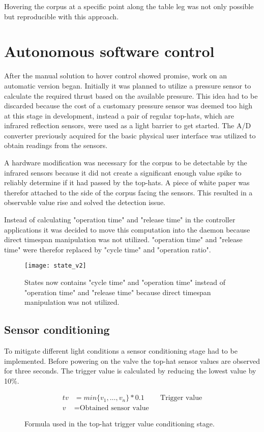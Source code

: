 Hovering the corpus at a specific point along the table leg was not only possible but reproducible with this approach.  

\section{Autonomous software control}
\author{Philip Trauner}

After the manual solution to hover control showed promise, work on an automatic version began. Initially it was planned to utilize a pressure sensor to calculate the required thrust based on the available pressure. This idea had to be discarded because the cost of a customary pressure sensor was deemed too high at this stage in development, instead a pair of regular top-hats, which are infrared reflection sensors, were used as a light barrier to get started. The A/D converter previously acquired for the basic physical user interface was utilized to obtain readings from the sensors.

A hardware modification was necessary for the corpus to be detectable by the infrared sensors because it did not create a significant enough value spike to reliably determine if it had passed by the top-hats.
A piece of white paper was therefor attached to the side of the corpus facing the sensors. This resulted in a observable value rise and solved the detection issue.

Instead of calculating "operation time" and "release time" in the controller applications it was decided to move this computation into the daemon because direct timespan manipulation was not utilized. "operation time" and "release time" were therefor replaced by "cycle time" and "operation ratio".

\begin{figure}[h]
\centering

\texttt{[image: state\_v2]}

\caption{States now contains "cycle time" and "operation time" instead of "operation time" and "release time" because direct timespan manipulation was not utilized.}
\end{figure}

\subsection{Sensor conditioning}
To mitigate different light conditions a sensor conditioning stage had to be implemented. Before powering on the valve the top-hat sensor values are observed for three seconds. The trigger value is calculated by reducing the lowest value by 10\%.
\begin{figure}[h]
\begin{align*}
    tv &=min\{v_1, \dots, v_n\} * 0.1 && \text{Trigger value} \\
    v &= \text{Obtained sensor value}
\end{align*}
\caption{Formula used in the top-hat trigger value conditioning stage.}
\end{figure}

